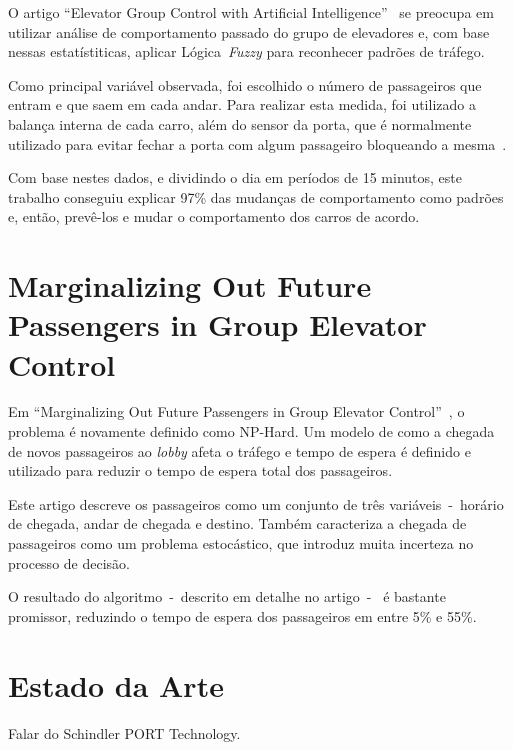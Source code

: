 O artigo ``Elevator Group Control with Artificial Intelligence''~\cite{marja97}
se preocupa em utilizar análise de comportamento passado do grupo de elevadores
e, com base nessas estatístiticas, aplicar Lógica~\textit{Fuzzy} para reconhecer
padrões de tráfego.

Como principal variável observada, foi escolhido o número de passageiros que
entram e que saem em cada andar. Para realizar esta medida, foi utilizado a
balança interna de cada carro, além do sensor da porta, que é normalmente
utilizado para evitar fechar a porta com algum passageiro bloqueando a mesma~\cite{marja97}.

Com base nestes dados, e dividindo o dia em períodos de 15 minutos, este
trabalho conseguiu explicar 97\% das mudanças de comportamento como padrões e,
então, prevê-los e mudar o comportamento dos carros de acordo.

\section{Marginalizing Out Future Passengers in Group Elevator
Control}

Em ``Marginalizing Out Future Passengers in Group Elevator
Control''~\cite{DBLP:journals/corr/abs-1212-2499}, o problema é novamente
definido como NP-Hard. Um modelo de como a chegada de novos passageiros ao
\textit{lobby} afeta o tráfego e tempo de espera é definido e utilizado para
reduzir o tempo de espera total dos passageiros.

Este artigo descreve os passageiros como um conjunto de três variáveis~-~horário
de chegada, andar de chegada e destino. Também caracteriza a chegada de
passageiros como um problema estocástico, que introduz muita incerteza no
processo de decisão.

O resultado do algoritmo~-~descrito em detalhe no artigo~-~ é bastante promissor,
reduzindo o tempo de espera dos passageiros em entre 5\% e 55\%.

\section{Estado da Arte}

Falar do Schindler PORT Technology.